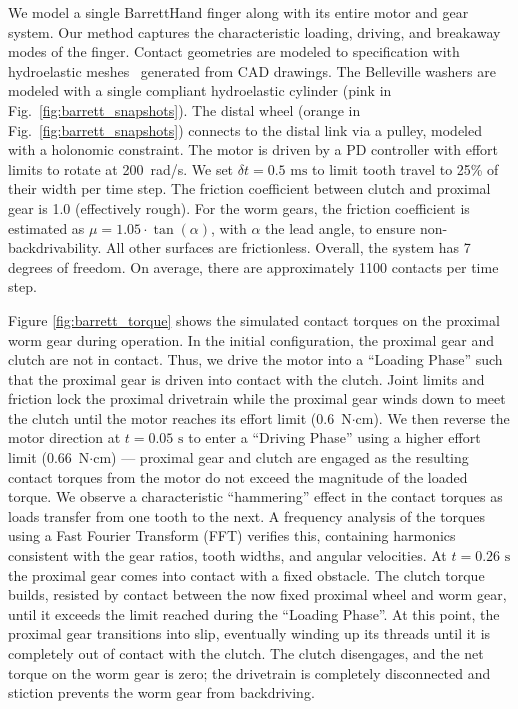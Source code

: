 We model a single BarrettHand finger along with its entire motor and gear
system. Our method captures the characteristic loading, driving, and breakaway
modes of the finger. Contact geometries are modeled to specification with
hydroelastic meshes~\cite{bib:elandt2019pressure} generated from CAD drawings.
The Belleville washers are modeled with a single compliant hydroelastic
cylinder (pink in Fig.~\ref{fig:barrett_snapshots}). The distal wheel (orange in
Fig.~\ref{fig:barrett_snapshots}) connects to the distal link via a pulley,
modeled with a holonomic constraint. The motor is driven by a PD controller with
effort limits to rotate at 200~rad/s. We set $\delta t = 0.5\text{ ms}$ to limit
tooth travel to 25\% of their width per time step. The friction coefficient
between clutch and proximal gear is 1.0 (effectively rough). For the worm gears,
the friction coefficient is estimated as $\mu=1.05\cdot\tan(\alpha)$, with
$\alpha$ the lead angle, to ensure non-backdrivability. All other surfaces are
frictionless. Overall, the system has 7 degrees of freedom. On average, there
are approximately 1100 contacts per time step.


Figure \ref{fig:barrett_torque} shows the simulated contact torques on the
proximal worm gear during operation. In the initial configuration, the proximal
gear and clutch are not in contact. Thus, we drive the motor into a ``Loading
Phase'' such that the proximal gear is driven into contact with the clutch. Joint
limits and friction lock the proximal drivetrain while the proximal gear winds
down to meet the clutch until the motor reaches its effort limit (0.6~N$\cdot$cm). We
then reverse the motor direction at $t = 0.05\text{ s}$ to enter a ``Driving
Phase'' using a higher effort limit (0.66~N$\cdot$cm) --- proximal gear and clutch are
engaged as the resulting contact torques from the motor do not exceed the
magnitude of the loaded torque. We observe a characteristic ``hammering'' effect
in the contact torques as loads transfer from one tooth to the next. A frequency
analysis of the torques using a Fast Fourier Transform (FFT) verifies this,
containing harmonics consistent with the gear ratios, tooth widths, and angular
velocities. At $t = 0.26\text{ s}$ the proximal gear comes into contact with a
fixed obstacle. The clutch torque builds, resisted by contact between the now
fixed proximal wheel and worm gear, until it exceeds the limit reached during
the ``Loading Phase''. At this point, the proximal gear transitions into slip,
eventually winding up its threads until it is completely out of contact with the
clutch. The clutch disengages, and the net torque on the worm gear is zero; the
drivetrain is completely disconnected and stiction prevents the worm gear from
backdriving.


